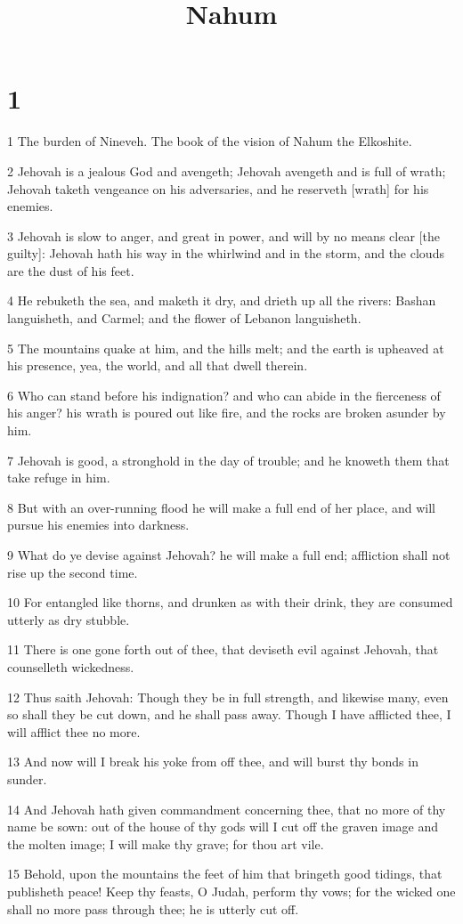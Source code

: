 

\title{Nahum}

\chapter{1}

\par 1 The burden of Nineveh. The book of the vision of Nahum the Elkoshite.
\par 2 Jehovah is a jealous God and avengeth; Jehovah avengeth and is full of wrath; Jehovah taketh vengeance on his adversaries, and he reserveth [wrath] for his enemies.
\par 3 Jehovah is slow to anger, and great in power, and will by no means clear [the guilty]: Jehovah hath his way in the whirlwind and in the storm, and the clouds are the dust of his feet.
\par 4 He rebuketh the sea, and maketh it dry, and drieth up all the rivers: Bashan languisheth, and Carmel; and the flower of Lebanon languisheth.
\par 5 The mountains quake at him, and the hills melt; and the earth is upheaved at his presence, yea, the world, and all that dwell therein.
\par 6 Who can stand before his indignation? and who can abide in the fierceness of his anger? his wrath is poured out like fire, and the rocks are broken asunder by him.
\par 7 Jehovah is good, a stronghold in the day of trouble; and he knoweth them that take refuge in him.
\par 8 But with an over-running flood he will make a full end of her place, and will pursue his enemies into darkness.
\par 9 What do ye devise against Jehovah? he will make a full end; affliction shall not rise up the second time.
\par 10 For entangled like thorns, and drunken as with their drink, they are consumed utterly as dry stubble.
\par 11 There is one gone forth out of thee, that deviseth evil against Jehovah, that counselleth wickedness.
\par 12 Thus saith Jehovah: Though they be in full strength, and likewise many, even so shall they be cut down, and he shall pass away. Though I have afflicted thee, I will afflict thee no more.
\par 13 And now will I break his yoke from off thee, and will burst thy bonds in sunder.
\par 14 And Jehovah hath given commandment concerning thee, that no more of thy name be sown: out of the house of thy gods will I cut off the graven image and the molten image; I will make thy grave; for thou art vile.
\par 15 Behold, upon the mountains the feet of him that bringeth good tidings, that publisheth peace! Keep thy feasts, O Judah, perform thy vows; for the wicked one shall no more pass through thee; he is utterly cut off.

